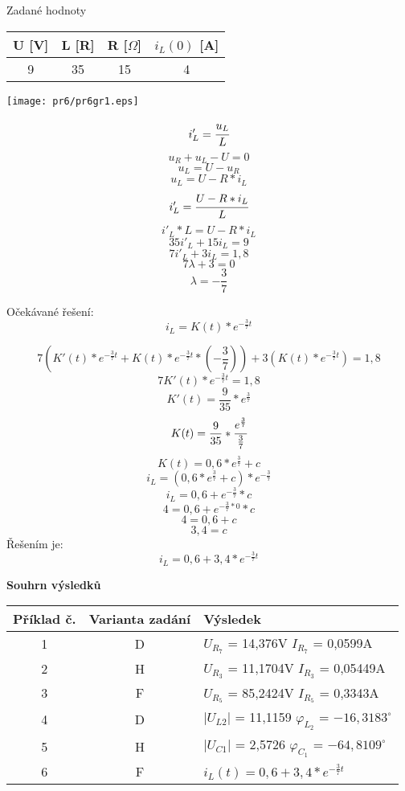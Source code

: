 \documentclass[a4paper,12pt]{article}
\begin{document}
Zadané hodnoty

\begin{tabular} {| c | c | c | c |}
\hline
  U [V]
& L [R]
& R [$\Omega$] 
& $i_L(0)$ [A] \\ \hline

9 & 35 & 15 & 4\\ \hline
\end{tabular}
\bigskip


\begin{center}
\texttt{[image: pr6/pr6gr1.eps]}
\end{center}

$$i'_L = \cfrac{u_L}{L}$$
$$u_R + u_L - U = 0$$
$$u_L  = U-u_R$$
$$u_L  = U-R * i_L$$
$$i'_L = \cfrac{U - R * i_L}{L}$$
$$i'_L * L = U - R * i_L$$
$$35i'_L + 15i_L = 9$$
$$7i'_L + 3i_L = 1,8$$
$$7\lambda + 3 = 0$$
$$\lambda = -\frac{3}{7}$$


Očekávané řešení:
$$i_L = K(t) * e^{-\frac{3}{7}t}$$
\bigskip

$$7(K'(t) * e^{-\frac{3}{7}t} + K(t) * e^{-\frac{3}{7}t} * (-\frac{3}{7}))+3(K(t) * e^{-\frac{3}{7}t})=1,8$$
$$7K'(t) * e^{-\frac{3}{7}t} = 1,8$$
$$K'(t) = \frac{9}{35} * e^{\frac{3}{7}}$$
$$K(t) = \frac{9}{35} * \cfrac{e^\frac{3}{7}}{\frac{3}{7}}$$
$$K(t)=0,6 * e^\frac{3}{7} + c$$
$$i_L = (0,6 * e^\frac{3}{7} + c) * e^{-\frac{3}{7}}$$
$$i_L = 0,6 + e^{-\frac{3}{7}} * c$$
$$4 = 0,6 + e^{-\frac{3}{7} * 0} * c$$
$$4 = 0,6 + c$$
$$3,4 = c$$
Řešením je:
$$i_L = 0,6 + 3,4 * e^{-\frac{3}{7}t}$$ 
\newpage
\begin{center}
\textbf{Souhrn výsledků}
\end{center}
\bigskip
	\begin{center}
    \begin{tabular}{|c|c|l|}  
    \hline
    Příklad č.  & Varianta zadání & Výsledek                            \\ \hline
    1           & D                & $U_{R_7}$ = 14,376V  \hspace{5mm} $I_{R_7}$ = 0,0599A \\ \hline
    2           & H                & $ U_{R_3}$ = 11,1704V \hspace{5mm}  $I_{R_3}$ = 0,05449A \\ \hline
    3           & F                & $U_{R_5}$ = 85,2424V \hspace{2mm} $I_{R_5}$ = 0,3343A \\ \hline
    4           & D                & $|U_{L2}|$ = 11,1159  \hspace{8mm} $\varphi_{L_2}$ = $-16,3183^{\circ}$        \\ \hline
    5           & H                & $|U_{C1}|$ = 2,5726  \hspace{7mm} $\varphi_{C_1}$ = $-64,8109^{\circ}$         \\ \hline
    6           & F                & $i_L(t)  = 0,6 + 3,4 * e^{-\frac{3}{7}t}$ \\ \hline
    \end{tabular}
    \end{center}
\end{document}
